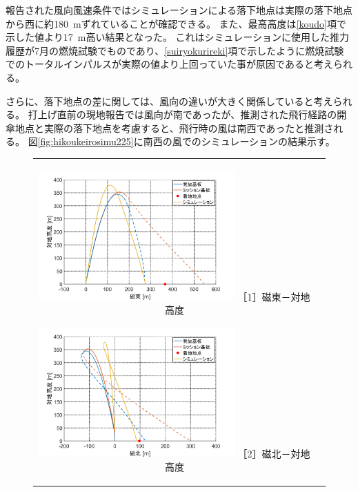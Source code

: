 \documentclass[a4paper,11pt,titlepage,uplatex]{jsarticle}
\begin{document}
報告された風向風速条件ではシミュレーションによる落下地点は実際の落下地点から西に約\SI{180}{m}ずれていることが確認できる。
また、最高高度は\ref{koudo}項で示した値より\SI{17}{m}高い結果となった。
これはシミュレーションに使用した推力履歴が7月の燃焼試験でものであり、\ref{suiryokurireki}項で示したように燃焼試験でのトータルインパルスが実際の値より上回っていた事が原因であると考えられる。

さらに、落下地点の差に関しては、風向の違いが大きく関係していると考えられる。
打上げ直前の現地報告では風向が南であったが、推測された飛行経路の開傘地点と実際の落下地点を考慮すると、飛行時の風は南西であったと推測される。
図\ref{fig:hikoukeirosimu225}に南西の風でのシミュレーションの結果示す。


\begin{figure}[H]
    \begin{tabular}{cc}
        \begin{minipage}{.48\textwidth}
            \centering
            \includegraphics[width=75mm]{pic_sim/pos3_eh_225.png}
            \hspace{16mm} {\small［1］磁東－対地高度}
        \end{minipage}
        \begin{minipage}{.48\textwidth}
            \centering
            \includegraphics[width=75mm]{pic_sim/pos3_nh_225.png}
            \hspace{16mm} {\small［2］磁北－対地高度}
        \end{minipage}
    \end{tabular}
    \centering

\end{figure}
\end{document}
